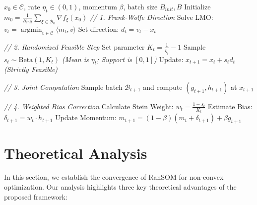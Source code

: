 \documentclass{article}
\theoremstyle{plain}
\theoremstyle{definition}
\theoremstyle{remark}
\DeclareMathOperator{\argmin}{argmin}
\begin{document}
\begin{algorithm}[tb]
   \caption{RanSOM-B: Beta-Distributed Second-Order Momentum}
   \label{alg:betasom}
\begin{algorithmic}[1]
    $x_0 \in \mathcal{C}$, rate $\eta_t \in (0, 1)$, momentum $\beta$, batch size $B_{init},B$
   \STATE Initialize $m_0 = \frac{1}{B_{init}} \sum_{\xi \in \mathcal{B}_0} \nabla f_{\xi}(x_0)$
   \STATE \textit{// 1. Frank-Wolfe Direction}
   \STATE Solve LMO: $v_t = \argmin_{v \in \mathcal{C}} \langle m_t, v \rangle$
   \STATE Set direction: $d_t = v_t - x_t$
   
   \STATE \textit{// 2. Randomized Feasible Step}
   \STATE Set parameter $K_t = \frac{1}{\eta_t} - 1$
   \STATE Sample $s_t \sim \mathrm{Beta}(1, K_t)$ \quad \textit{(Mean is $\eta_t$; Support is $[0,1]$)}
   \STATE Update: $x_{t+1} = x_t + s_t d_t$ \quad \textit{(Strictly Feasible)}
   
   \STATE \textit{// 3. Joint Computation}
   \STATE Sample batch $\mathcal{B}_{t+1}$ and compute $(g_{t+1}, h_{t+1})$ at $x_{t+1}$
   
   \STATE \textit{// 4. Weighted Bias Correction}
   \STATE Calculate Stein Weight: $w_t = \frac{1-s_t}{K_t}$
   \STATE Estimate Bias: $\delta_{t+1} = w_t \cdot h_{t+1}$
   \STATE Update Momentum: $m_{t+1} = (1-\beta)(m_t + \delta_{t+1}) + \beta g_{t+1}$
   \ENDFOR
\end{algorithmic}
\end{algorithm}
\section{Theoretical Analysis}
\label{sec:theory}

In this section, we establish the convergence of RanSOM for non-convex optimization. Our analysis highlights three key theoretical advantages of the proposed framework:
\end{document}
